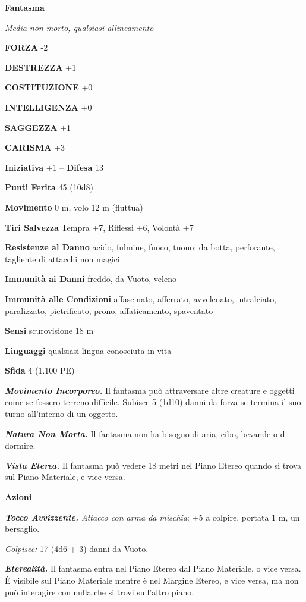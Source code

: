 \begin{multicols}{2}
\medskip{}\textbf{Fantasma}

\emph{Media non morto, qualsiasi allineamento}

\textbf{FORZA} -2

\textbf{DESTREZZA} +1

\textbf{COSTITUZIONE} +0

\textbf{INTELLIGENZA} +0

\textbf{SAGGEZZA} +1

\textbf{CARISMA} +3

\textbf{Iniziativa} +1 -- \textbf{Difesa} 13

\textbf{Punti Ferita} 45 (10d8)

\textbf{Movimento} 0 m, volo 12 m (fluttua)

\textbf{Tiri Salvezza} Tempra +7, Riflessi +6, Volontà +7

\textbf{Resistenze al Danno} acido, fulmine, fuoco, tuono; da botta, perforante, tagliente di attacchi non magici

\textbf{Immunità ai Danni} freddo, da Vuoto, veleno

\textbf{Immunità alle Condizioni} affascinato, afferrato, avvelenato, intralciato, paralizzato, pietrificato, prono, affaticamento, spaventato

\textbf{Sensi} scurovisione 18 m

\textbf{Linguaggi} qualsiasi lingua conosciuta in vita

\textbf{Sfida} 4 (1.100 PE)

\emph{\textbf{Movimento Incorporeo.}} Il fantasma può attraversare altre creature e oggetti come se fossero terreno difficile. Subisce 5 (1d10) danni da forza se termina il suo turno all'interno di un oggetto. 

\emph{\textbf{Natura Non Morta.}} Il fantasma non ha bisogno di aria, cibo, bevande o di dormire.

\emph{\textbf{Vista Eterea.}} Il fantasma può vedere 18 metri nel Piano Etereo quando si trova sul Piano Materiale, e vice versa.

\textbf{Azioni}

\emph{\textbf{Tocco Avvizzente.} Attacco con arma da mischia}: +5 a colpire, portata 1 m, un bersaglio.

\emph{Colpisce:} 17 (4d6 + 3) danni da Vuoto.

\emph{\textbf{Eterealità.}} Il fantasma entra nel Piano Etereo dal Piano Materiale, o vice versa. È visibile sul Piano Materiale mentre è nel Margine Etereo, e vice versa, ma non può interagire con nulla che si trovi sull'altro piano.


\end{multicols}
